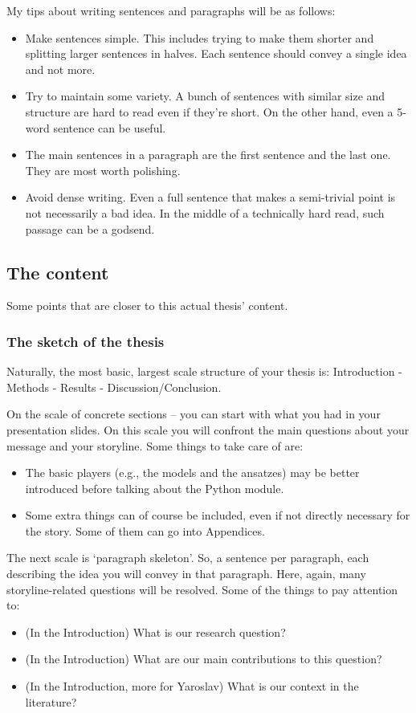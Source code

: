 \documentclass[10pt, a4paper]{article}
\begin{document}
My tips about writing sentences and paragraphs will be as follows:

\begin{itemize}
	\item Make sentences simple. This includes trying to make them shorter and splitting larger sentences in halves. Each sentence should convey a single idea and not more.
	\item Try to maintain some variety. A bunch of sentences with similar size and structure are hard to read even if they're short. On the other hand, even a 5-word sentence can be useful.
	\item The main sentences in a paragraph are the first sentence and the last one. They are most worth polishing.
	\item Avoid dense writing. Even a full sentence that makes a semi-trivial point is not necessarily a bad idea. In the middle of a technically hard read, such passage can be a godsend. 
\end{itemize}

\subsection*{The content}

Some points that are closer to this actual thesis' content.

\subsubsection*{The sketch of the thesis}

Naturally, the most basic, largest scale structure of your thesis is: Introduction - Methods - Results - Discussion/Conclusion.

On the scale of concrete sections -- you can start with what you had in your presentation slides. On this scale you will confront the main questions about your message and your storyline. Some things to take care of are:
\begin{itemize}
\item The basic players (e.g., the models and the ansatzes) may be better introduced before talking about the Python module.
\item Some extra things can of course be included, even if not directly necessary for the story. Some of them can go into Appendices.
\end{itemize}

The next scale is `paragraph skeleton'. So, a sentence per paragraph, each describing the idea you will convey in that paragraph. Here, again, many storyline-related questions will be resolved. Some of the things to pay attention to:
\begin{itemize}
\item (In the Introduction) What is our research question?
\item (In the Introduction) What are our main contributions to this question?
\item (In the Introduction, more for Yaroslav) What is our context in the literature?
\end{itemize}
\end{document}
